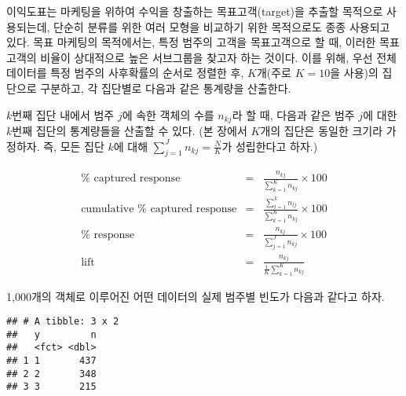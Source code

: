 \documentclass[]{book}
\newenvironment{Shaded}{\begin{snugshade}}{\end{snugshade}}
\newcommand{\DataTypeTok}[1]{\textcolor[rgb]{0.13,0.29,0.53}{#1}}
\newcommand{\DecValTok}[1]{\textcolor[rgb]{0.00,0.00,0.81}{#1}}
\newcommand{\KeywordTok}[1]{\textcolor[rgb]{0.13,0.29,0.53}{\textbf{#1}}}
\newcommand{\NormalTok}[1]{#1}
\newcommand{\OperatorTok}[1]{\textcolor[rgb]{0.81,0.36,0.00}{\textbf{#1}}}
\newcommand{\StringTok}[1]{\textcolor[rgb]{0.31,0.60,0.02}{#1}}
\begin{document}
이익도표는 마케팅을 위하여 수익을 창출하는 목표고객(target)을 추출할 목적으로 사용되는데, 단순히 분류를 위한 여러 모형을 비교하기 위한 목적으로도 종종 사용되고 있다. 목표 마케팅의 목적에서는, 특정 범주의 고객을 목표고객으로 할 때, 이러한 목표고객의 비율이 상대적으로 높은 서브그룹을 찾고자 하는 것이다. 이를 위해, 우선 전체 데이터를 특정 범주의 사후확률의 순서로 정렬한 후, \(K\)개(주로 \(K = 10\)을 사용)의 집단으로 구분하고, 각 집단별로 다음과 같은 통계량을 산출한다.

\(k\)번째 집단 내에서 범주 \(j\)에 속한 객체의 수를 \(n_{kj}\)라 할 때, 다음과 같은 범주 \(j\)에 대한 \(k\)번째 집단의 통계량들을 산출할 수 있다. (본 장에서 \(K\)개의 집단은 동일한 크기라 가정하자. 즉, 모든 집단 \(k\)에 대해 \(\sum_{j = 1}^{J} n_{kj} = \frac{N}{K}\)가 성립한다고 하자.)

\begin{eqnarray*}
\text{$\%$ captured response} &=& \frac{n_{kj}}{\sum_{k = 1}^{K} n_{kj}} \times 100\\
\text{cumulative $\%$ captured response} &=& \frac{\sum_{l = 1}^{k} n_{lj}}{\sum_{k = 1}^{K} n_{kj}} \times 100\\
\text{$\%$ response} &=& \frac{n_{kj}}{\sum_{j = 1}^{J} n_{kj}} \times 100\\
\text{lift} &=& \frac{n_{kj}}{\frac{1}{K} \sum_{k = 1}^{K} n_{kj}}
\end{eqnarray*}

1,000개의 객체로 이루어진 어떤 데이터의 실제 범주별 빈도가 다음과 같다고 하자.

\begin{Shaded}
\end{Shaded}

\begin{verbatim}
## # A tibble: 3 x 2
##   y         n
##   <fct> <dbl>
## 1 1       437
## 2 2       348
## 3 3       215
\end{verbatim}
\end{document}

